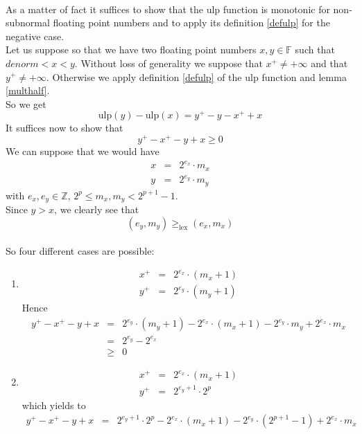 \documentclass[a4paper,10pt,twoside]{article}
\newenvironment{proof}[1][Proof]{\begin{trivlist}
\item[\hskip \labelsep {\bfseries #1}]}{\end{trivlist}}
\newcommand{\Z}{\ensuremath{\mathbb {Z}}}
\newcommand{\F}{\ensuremath{\mathbb {F}}}
\newcommand{\mUlp}{\ensuremath{\mathrm{ulp}}}
\begin{document}
\begin{proof} ~ \\
As a matter of fact it suffices to show that the $\mUlp$ function is monotonic for non-subnormal floating point numbers 
and to apply its definition \ref{defulp} for the negative case.\\
Let us suppose so that we have two floating point numbers $x, y \in \F$ such that $denorm < x < y$. 
Without loss of generality we suppose that $x^+ \not = + \infty$ and that 
$y^+ \not = + \infty$. Otherwise we apply definition \ref{defulp} of the $\mUlp$ function and lemma \ref{multhalf}.\\
So we get
$$\mUlp\left( y \right) - \mUlp\left( x \right) = y^+ - y - x^+ + x$$
It suffices now to show that 
$$y^+ - x^+ - y + x \geq 0$$
We can suppose that we would have
\begin{eqnarray*}
x & = & 2^{e_x} \cdot m_x \\
y & = & 2^{e_y} \cdot m_y 
\end{eqnarray*}
with $e_x, e_y \in \Z$, $2^p \leq m_x, m_y < 2^{p+1} - 1$.\\
Since $y > x$, we clearly see that
$$\left( e_y, m_y \right) \geq_{\mbox{lex}} \left( e_x, m_x \right)$$ \\
So four different cases are possible:
\begin{enumerate}
\item \begin{eqnarray*}
x^+ & = & 2^{e_x} \cdot \left( m_x + 1 \right) \\
y^+ & = & 2^{e_y} \cdot \left( m_y + 1 \right)
\end{eqnarray*}
Hence
\begin{eqnarray*}
y^+ - x^+ - y + x & = & 2^{e_y} \cdot \left( m_y + 1 \right) - 2^{e_x} \cdot \left( m_x + 1 \right) - 2^{e_y} \cdot m_y + 2^{e_x} \cdot m_x \\
& = & 2^{e_y} - 2^{e_x} \\
& \geq & 0
\end{eqnarray*}
\item \begin{eqnarray*}
x^+ & = & 2^{e_x} \cdot \left( m_x + 1 \right) \\
y^+ & = & 2^{e_y+1} \cdot 2^p
\end{eqnarray*}
which yields to
\begin{eqnarray*}
y^+ - x^+ - y + x & = & 2^{e_y+1} \cdot 2^p - 2^{e_x} \cdot \left( m_x + 1 \right) - 2^{e_y} \cdot \left( 2^{p+1} - 1 \right) + 2^{e_x} \cdot m_x \\

\end{eqnarray*}
\end{enumerate}
\end{proof}
\end{document}
